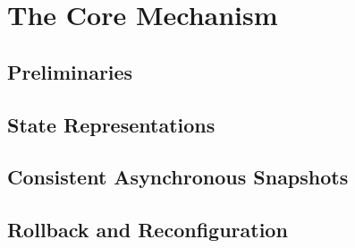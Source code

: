
\section{The Core Mechanism}

\subsection{Preliminaries}

\subsection{State Representations}

\subsection{Consistent Asynchronous Snapshots}

\subsection{Rollback and Reconfiguration}